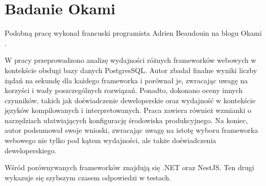 \section{Badanie Okami}
Podobną pracę wykonał francuski programista Adrien Beaudouin na blogu Okami \cite{okami1012024Benchmark}.

W pracy przeprowadzono analizę wydajności różnych frameworków webowych w kontekście obsługi bazy danych PostgresSQL.
Autor zbadał finalne wyniki liczby żądań na sekundę dla każdego frameworka i porównał je, zwracając uwagę na korzyści i wady poszczególnych rozwiązań. 
Ponadto, dokonano oceny innych czynników, takich jak doświadczenie deweloperskie oraz wydajność w kontekście języków kompilowanych i interpretowanych.
Praca zawiera również wzmianki o narzędziach ułatwiających konfigurację środowiska produkcyjnego.
Na koniec, autor podsumował swoje wnioski, zwracając uwagę na istotę wyboru frameworka webowego nie tylko pod kątem wydajności, ale także doświadczenia deweloperskiego.

Wśród porównywanych frameworków znajdują się .NET oraz NestJS.
Ten drugi wykazuje się szybszym czasem odpowiedzi w testach.